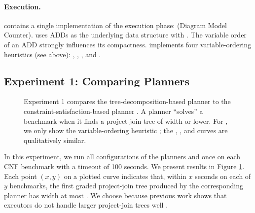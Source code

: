 \paragraph{Execution.} 
 contains a single implementation of the execution phase: \Dmc{} (Diagram Model Counter).
\Dmc{} uses ADDs as the underlying data structure with \cudd{} \cite{somenzi2015cudd}.
The variable order of an ADD strongly influences its compactness.
\dmc{} implements four variable-ordering heuristics (see above): \mcs, \lexp, \lexm, and \minfill{}.



\subsection{Experiment 1: Comparing Planners}
\begin{figure}[t]
    \centering
    
    \vspace*{-0.9cm}
    \caption{
        Experiment 1 compares the tree-decomposition-based planner \Lg{} to the constraint-satisfaction-based planner \htb{}.
	    A planner ``solves'' a benchmark when it finds a project-join tree of width \maxWidth{} or lower.
        For \htb, we only show the variable-ordering heuristic \mcs{}; the \lexp{}, \lexm{}, and \minfill{} curves are qualitatively similar.
    }
    \label{figPlanning}
\end{figure}

In this experiment, we run all configurations of the planners \Lg{} and \htb{} once on each CNF benchmark with a timeout of 100 seconds.
We present results in Figure \ref{figPlanning}.
Each point $(x, y)$ on a plotted curve indicates that, within $x$ seconds on each of $y$ benchmarks, the first graded project-join tree produced by the corresponding planner has width at most \maxWidth{}.
We choose \maxWidth{} because previous work shows that executors do not handle larger project-join trees well \cite{DDV19,dudek2020dpmc}. %


